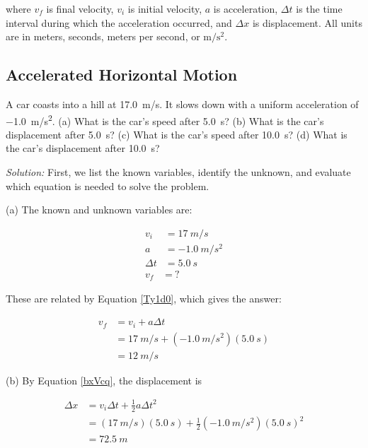 \documentclass[dvipsnames]{article}
\begin{document}
where $v_f$ is final velocity, $v_i$ is initial velocity, $a$ is acceleration, $\Delta t$ is the time interval during which the acceleration occurred, and $\Delta x$ is displacement. All units are in meters, seconds, meters per second, or $\mathrm{m/s^2}$.

\subsection{Accelerated Horizontal Motion}

\begin{example} %
    A car coasts into a hill at \SI{17.0}{m/s}. It slows down with a uniform acceleration of \SI{-1.0}{m/s^2}. (a) What is the car's speed after \SI{5.0}{s}? (b) What is the car's displacement after \SI{5.0}{s}? (c) What is the car's speed after \SI{10.0}{s}? (d) What is the car's displacement after \SI{10.0}{s}?
\end{example}

\textit{Solution:}
First, we list the known variables, identify the unknown, and evaluate which equation is needed to solve the problem. 

(a) The known and unknown variables are:

\begin{align*}
    v_i &= \SI{17}{m/s} \\[1ex]
    a &= \SI{-1.0}{m/s^2} \\[1ex]
    \Delta t &= \SI{5.0}{s} \\[1ex]
    v_f &=\: \text{?}
\end{align*}

These are related by Equation \eqref{Ty1d0}, which gives the answer:

\begin{align*}
    v_f &= v_i + a \Delta t \\[1ex]
    &= \SI{17}{m/s} + \left(\SI{-1.0}{m/s^2}\right)(\SI{5.0}{s}) \\[1ex]
    &= \boxed{\SI{12}{m/s}}
\end{align*}

(b) By Equation \eqref{bxVcq}, the displacement is

\begin{align*}
    \Delta x &= v_i \Delta t + \frac{1}{2}a \Delta t^2 \\[1ex]
    &= (\SI{17}{m/s}) (\SI{5.0}{s}) + \frac{1}{2} \left(\SI{-1.0}{m/s^2}\right)(\SI{5.0}{s})^2 \\[1ex]
    &= \boxed{\SI{72.5}{m}}
\end{align*}
\end{document}
